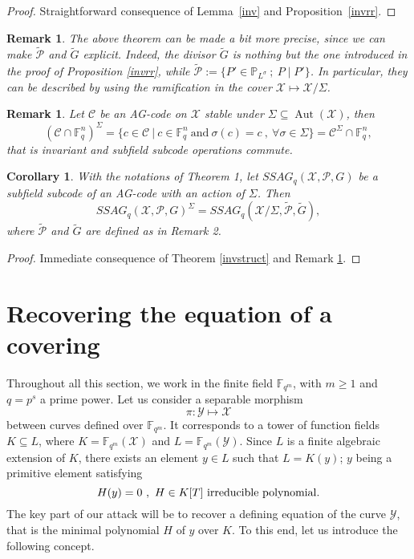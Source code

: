 \documentclass[10pt]{article}
\newtheorem{coro1}[thm]{Corollary}
\newtheorem{rq1}[thm]{Remark}
\newcommand{\s}{\vspace{0.3cm}}
\newcommand{\PP}{\mathbb{P}}
\newcommand{\fqm}{\mathbb{F}_{q^m}}
\newcommand{\fq}{\mathbb{F}_q}
\newcommand{\su}{\subseteq}
\newcommand{\X}{\mathcal{X}}
\newcommand{\Y}{\mathcal{Y}}
\newcommand{\PR}{\mathcal{P}}
\newcommand{\Aut}{\operatorname{Aut}}
\newcommand{\hugues}[1]{\textcolor{blue}{#1}}
\newcommand{\notehugues}[1]{\marginpar{\small\hugues{#1}}}
\begin{document}
\s
 
\begin{proof}
Straightforward consequence of Lemma~\ref{inv} and Proposition~\ref{invrr}.
\end{proof}

\s


\begin{rq1} \rm
The above theorem can be made a bit more precise, since we can make $\tilde{\PR}$ and $\tilde{G}$ explicit. Indeed, the divisor $\tilde{G}$ is nothing but the one introduced in the proof of Proposition \ref{invrr}, while $\tilde{\PR} := \{P' \in \PP_{L^{\sigma}} \ ; \ P \mid P'\}$. In particular, they can be described by using the ramification in the cover $\X \longmapsto \X/\Sigma$.
\end{rq1}

\s

\begin{rq1} \rm \label{commute}
Let $\mathcal{C}$ be an AG-code on $\X$ stable under $\Sigma \su \Aut(\X)$, then
\[(\mathcal{C}\cap \fq^n)^{\Sigma} = \{c \in \mathcal{C} \ | \ c \in \fq^n \ \textrm{and} \ \sigma(c)=c \ , \ \forall \sigma \in \Sigma\} = \mathcal{C}^{\Sigma} \cap \fq^n,\]
that is invariant and subfield subcode operations commute.
\end{rq1}

\s

\begin{coro1} \label{ssag}
With the notations of Theorem 1, let $SSAG_q(\X,\PR,G)$ be a subfield subcode of an AG-code with an action of $\Sigma$. Then 
\[SSAG_q(\X,\PR,G)^{\Sigma} = SSAG_q(\X/\Sigma,\tilde{\PR},\tilde{G}),\]
where $\tilde{\PR}$ and $\tilde{G}$ are defined as in Remark \rm 2.
\end{coro1}

\s

\begin{proof}
Immediate consequence of Theorem \ref{invstruct} and Remark \ref{commute}.
\end{proof}

\s

\section{Recovering the equation of a covering}


\s

Throughout all this section, we work in the finite field $\fqm$, with $m\geq 1$ and $q=p^s$ a prime power. Let us consider a separable morphism 
\[\pi : \Y \longmapsto \X\]
between curves defined over $\fqm$. It corresponds to a tower of function fields $K \su L$,
where $K=\fqm(\X)$ and $L=\fqm(\Y)$. Since $L$ is a finite  algebraic extension of $K$, there exists an element $y \in L$ such that $L=K(y)$; $y$ being a primitive element satisfying
\[ H(y)=0 \ , \ H \in K[T] \ \rm irreducible \ polynomial.\]
The key part of our attack will be to recover a defining equation of the curve $\Y$, that is the minimal polynomial $H$ of $y$ over $K$. To this end, let us introduce the following concept.
\end{document}
